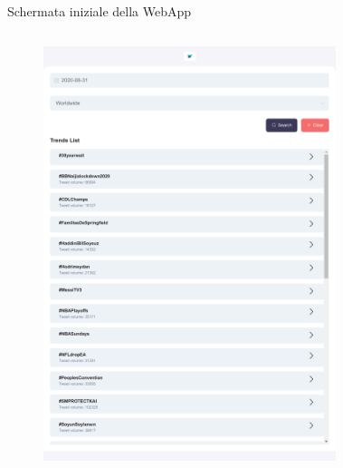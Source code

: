 \documentclass[xcolor=svgnames, aspectratio=169]{beamer}
\begin{document}
\begin{frame}{Schermata iniziale della WebApp}
\begin{columns}[t]
        \vspace*{-18pt}
        \begin{figure}[H]
            \includegraphics[width=0.75\paperwidth,height=0.75\paperheight,keepaspectratio]{FrontEnd_TrendrApp.pdf}
        \end{figure}
        \vspace*{-18pt}
        \begin{figure}[H]

\end{figure}
\end{columns}
\end{frame}
\end{document}
